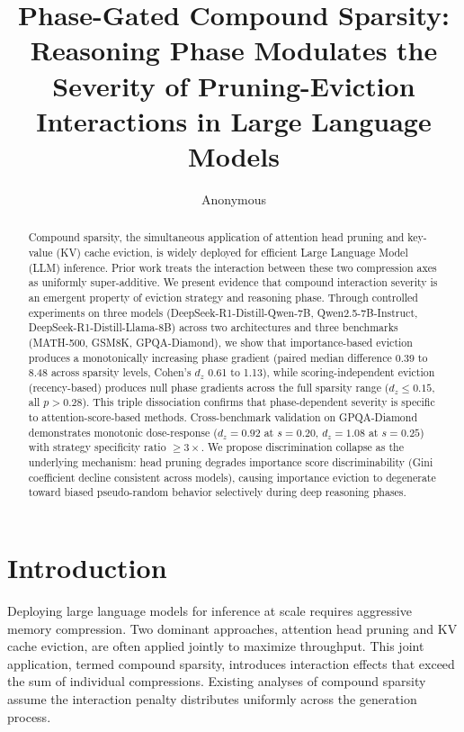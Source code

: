 \documentclass[11pt,a4paper]{article}
\title{Phase-Gated Compound Sparsity: Reasoning Phase Modulates the Severity of Pruning-Eviction Interactions in Large Language Models}
\author{Anonymous}
\date{}
\begin{document}
\maketitle

\begin{abstract}
Compound sparsity, the simultaneous application of attention head pruning and key-value (KV) cache eviction, is widely deployed for efficient Large Language Model (LLM) inference. Prior work treats the interaction between these two compression axes as uniformly super-additive. We present evidence that compound interaction severity is an emergent property of eviction strategy and reasoning phase. Through controlled experiments on three models (DeepSeek-R1-Distill-Qwen-7B, Qwen2.5-7B-Instruct, DeepSeek-R1-Distill-Llama-8B) across two architectures and three benchmarks (MATH-500, GSM8K, GPQA-Diamond), we show that importance-based eviction produces a monotonically increasing phase gradient (paired median difference 0.39 to 8.48 across sparsity levels, Cohen's $d_z$ 0.61 to 1.13), while scoring-independent eviction (recency-based) produces null phase gradients across the full sparsity range ($d_z \leq 0.15$, all $p > 0.28$). This triple dissociation confirms that phase-dependent severity is specific to attention-score-based methods. Cross-benchmark validation on GPQA-Diamond demonstrates monotonic dose-response ($d_z = 0.92$ at $s{=}0.20$, $d_z = 1.08$ at $s{=}0.25$) with strategy specificity ratio $\geq 3\times$. We propose discrimination collapse as the underlying mechanism: head pruning degrades importance score discriminability (Gini coefficient decline consistent across models), causing importance eviction to degenerate toward biased pseudo-random behavior selectively during deep reasoning phases.
\end{abstract}

\section{Introduction}

Deploying large language models for inference at scale requires aggressive memory compression. Two dominant approaches, attention head pruning and KV cache eviction, are often applied jointly to maximize throughput. This joint application, termed compound sparsity, introduces interaction effects that exceed the sum of individual compressions. Existing analyses of compound sparsity \citep{spark2024,slim2024} assume the interaction penalty distributes uniformly across the generation process.
\end{document}
